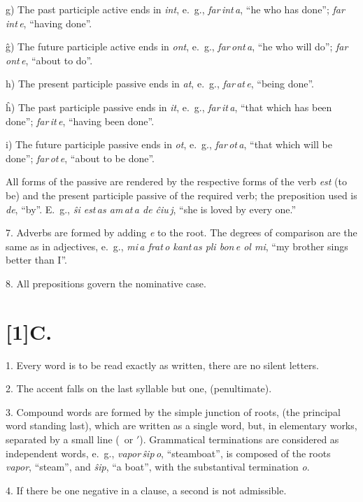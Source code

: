 \documentclass[12pt,twoside]{book}
\begin{document}
g) The past participle active ends in \emph{int}, e.~g., \emph{far\,int\,a}, “he who has done”; \emph{far\,int\,e}, “having done”.

ĝ) The future participle active ends in \emph{ont}, e.~g., \emph{far\,ont\,a}, “he who will do”; \emph{far\,ont\,e}, “about to do”.

h) The present participle passive ends in \emph{at}, e.~g., \emph{far\,at\,e}, “being done”.

ĥ) The past participle passive ends in \emph{it}, e.~g., \emph{far\,it\,a}, “that which has been done”; \emph{far\,it\,e}, “having been done”.

i) The future participle passive ends in \emph{ot}, e.~g., \emph{far\,ot\,a}, “that which will be done”; \emph{far\,ot\,e}, “about to be done”.

All forms of the passive are rendered by the respective forms of the verb \emph{est} (to be) and the present participle passive of the required verb; the preposition used is \emph{de}, “by”. E.~g., \emph{ŝi est\,as am\,at\,a de ĉiu\,j}, “she is loved by every one.”

7. Adverbs are formed by adding \emph{e} to the root. The degrees of comparison are the same as in adjectives, e.~g., \emph{mi\,a frat\,o kant\,as pli bon\,e ol mi}, “my brother sings better than I”.

8. All prepositions govern the nominative case.

\section*{\scalebox{0.8}[1]C. \hspace{.2em} }

1. Every word is to be read exactly as written, there are no silent letters.

2. The accent falls on the last syllable but one, (penultimate).

3. Compound words are formed by the simple junction of roots, (the principal word standing last), which are written as a single word, but, in elementary works, separated by a small line (\, or {$'$}). Grammatical terminations are considered as independent words, e.~g., \emph{vapor\,ŝip\,o}, “steamboat”, is composed of the roots \emph{vapor}, “steam”, and \emph{ŝip}, “a boat”, with the substantival termination \emph{o}.

4. If there be one negative in a clause, a second is not admissible.
\end{document}

